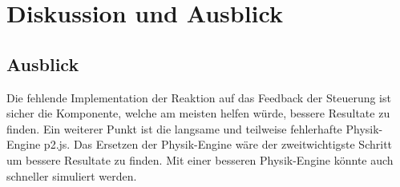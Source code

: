 %
%


\chapter{Diskussion und Ausblick}


  \section{Ausblick}
    Die fehlende Implementation der Reaktion auf das Feedback der Steuerung ist sicher die Komponente, welche am meisten helfen würde, bessere Resultate zu finden.
    Ein weiterer Punkt ist die langsame und teilweise fehlerhafte Physik-Engine p2.js. Das Ersetzen der Physik-Engine wäre der zweitwichtigste Schritt um bessere Resultate zu finden.
    Mit einer besseren Physik-Engine könnte auch schneller simuliert werden.
